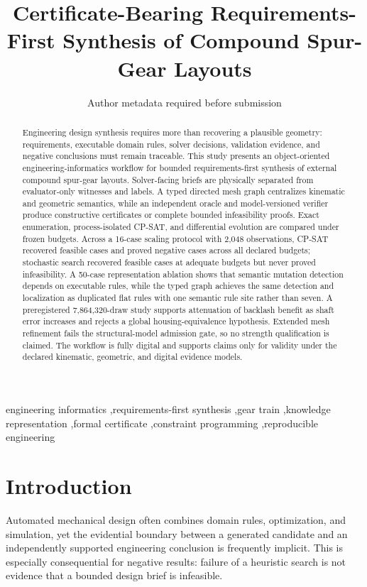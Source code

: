 \documentclass[preprint,12pt]{elsarticle}
\begin{document}
\begin{frontmatter}
\title{Certificate-Bearing Requirements-First Synthesis of Compound Spur-Gear Layouts}
\author{Author metadata required before submission}
\begin{abstract}
Engineering design synthesis requires more than recovering a plausible geometry: requirements, executable domain rules, solver decisions, validation evidence, and negative conclusions must remain traceable. This study presents an object-oriented engineering-informatics workflow for bounded requirements-first synthesis of external compound spur-gear layouts. Solver-facing briefs are physically separated from evaluator-only witnesses and labels. A typed directed mesh graph centralizes kinematic and geometric semantics, while an independent oracle and model-versioned verifier produce constructive certificates or complete bounded infeasibility proofs. Exact enumeration, process-isolated CP-SAT, and differential evolution are compared under frozen budgets. Across a 16-case scaling protocol with 2,048 observations, CP-SAT recovered feasible cases and proved negative cases across all declared budgets; stochastic search recovered feasible cases at adequate budgets but never proved infeasibility. A 50-case representation ablation shows that semantic mutation detection depends on executable rules, while the typed graph achieves the same detection and localization as duplicated flat rules with one semantic rule site rather than seven. A preregistered 7,864,320-draw study supports attenuation of backlash benefit as shaft error increases and rejects a global housing-equivalence hypothesis. Extended mesh refinement fails the structural-model admission gate, so no strength qualification is claimed. The workflow is fully digital and supports claims only for validity under the declared kinematic, geometric, and digital evidence models.
\end{abstract}
\begin{keyword}
engineering informatics \sep requirements-first synthesis \sep gear train \sep knowledge representation \sep formal certificate \sep constraint programming \sep reproducible engineering
\end{keyword}
\end{frontmatter}
\section{Introduction}
Automated mechanical design often combines domain rules, optimization, and simulation, yet the evidential boundary between a generated candidate and an independently supported engineering conclusion is frequently implicit. This is especially consequential for negative results: failure of a heuristic search is not evidence that a bounded design brief is infeasible.
\end{document}
